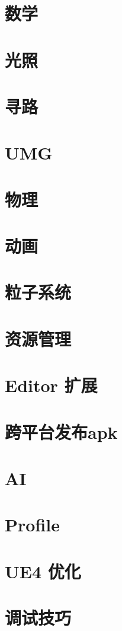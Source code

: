 \documentclass[UTF8,a4paper,12pt]{ctexbook}
\begin{document}
\chapter{数学}
	
\chapter{光照}
	
\chapter{寻路}
	
\chapter{UMG}
		
\chapter{物理}
		
\chapter{动画}
	
\chapter{粒子系统}
							
\chapter{资源管理}

\chapter{Editor 扩展}
		
\chapter{跨平台发布apk}

\chapter{AI}

\chapter{Profile}
	
\chapter{UE4 优化}

\chapter{调试技巧}
	
\end{document}
